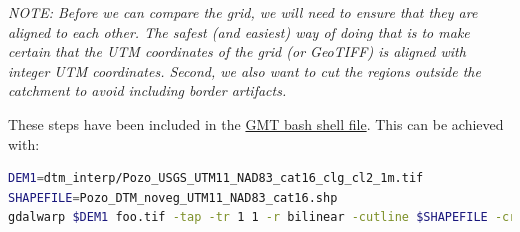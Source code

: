\documentclass[a4paperpaper,,tablecaptionabove]{scrartcl}
\begin{document}
\emph{NOTE: Before we can compare the grid, we will need to ensure that
they are aligned to each other. The safest (and easiest) way of doing
that is to make certain that the UTM coordinates of the grid (or
GeoTIFF) is aligned with integer UTM coordinates. Second, we also want
to cut the regions outside the catchment to avoid including border
artifacts.}

These steps have been included in the
\href{https://github.com/BodoBookhagen/PC_geomorph_roughness/blob/master/example_01/example01_create_DEM_comparison_ground_classification_gmt.sh}{GMT
bash shell file}. This can be achieved with:

\begin{lstlisting}[language=bash]
DEM1=dtm_interp/Pozo_USGS_UTM11_NAD83_cat16_clg_cl2_1m.tif
SHAPEFILE=Pozo_DTM_noveg_UTM11_NAD83_cat16.shp
gdalwarp $DEM1 foo.tif -tap -tr 1 1 -r bilinear -cutline $SHAPEFILE -crop_to_cutline -co COMPRESS=DEFLATE -co ZLEVEL=7 -co predictor=3
\end{lstlisting}
\end{document}
